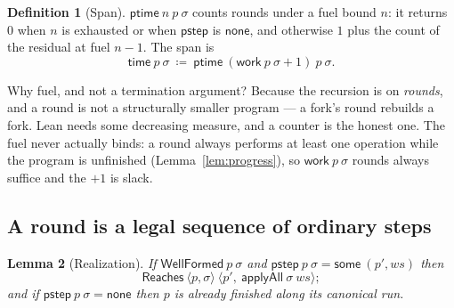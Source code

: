 \documentclass[11pt,a4paper]{article}
\theoremstyle{definition}
\newtheorem{definition}{Definition}
\theoremstyle{plain}
\newtheorem{lemma}[definition]{Lemma}
\theoremstyle{remark}
\newcommand{\st}{\sigma}
\newcommand{\wf}{\mathsf{WellFormed}}
\newcommand{\work}{\mathsf{work}}
\newcommand{\spn}{\mathsf{time}}
\newcommand{\pstep}{\mathsf{pstep}}
\newcommand{\Reaches}{\mathsf{Reaches}}
\begin{document}
\begin{definition}[Span]\label{def:time}
$\mathsf{ptime}\ n\ p\ \st$ counts rounds under a fuel bound $n$: it returns $0$ when $n$ is
exhausted or when $\pstep$ is $\mathsf{none}$, and otherwise $1$ plus the count of the
residual at fuel $n-1$. The span is
\[
  \spn\ p\ \st \ \coloneqq\ \mathsf{ptime}\ (\work\ p\ \st + 1)\ p\ \st .
\]
\end{definition}

Why fuel, and not a termination argument? Because the recursion is on \emph{rounds}, and a
round is not a structurally smaller program --- a fork's round rebuilds a fork. Lean needs
some decreasing measure, and a counter is the honest one. The fuel never actually binds: a
round always performs at least one operation while the program is unfinished
(Lemma~\ref{lem:progress}), so $\work\ p\ \st$ rounds always suffice and the $+1$ is slack.

\subsection{A round is a legal sequence of ordinary steps}\label{sec:cost:realize}

\begin{lemma}[Realization]\label{lem:pstepreaches}
If $\wf\ p\ \st$ and $\pstep\ p\ \st = \mathsf{some}\ (p', ws)$ then
\[
  \Reaches\ \langle p, \st\rangle\ \langle p',\ \mathsf{applyAll}\ \st\ ws\rangle ;
\]
and if $\pstep\ p\ \st = \mathsf{none}$ then $p$ is already finished along its canonical run.
\end{lemma}
\end{document}
